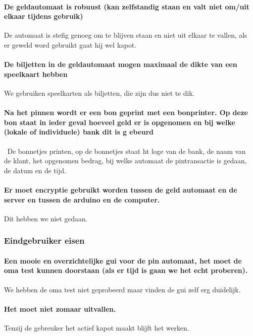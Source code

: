 \documentclass{article}
\begin{document}
\paragraph{De geldautomaat is robuust (kan zelfstandig staan en valt niet om/uit elkaar tijdens gebruik)}
De automaat is stefig genoeg om te blijven staan en niet uit elkaar te vallen, als er geweld word gebruikt gaat hij wel kapot.

\paragraph{De biljetten in de geldautomaat mogen maximaal de dikte van een speelkaart hebben}
We gebruiken speelkarten als biljetten, die zijn dus niet te dik.

\paragraph{Na het pinnen wordt er een bon geprint met een bonprinter. Op deze bon staat in ieder geval hoeveel geld er is opgenomen en bij welke (lokale of individuele) bank dit is g
ebeurd}\
De bonnetjes printen, op de bonnetjes staat ht loge van de bank, de naam van de klant, het opgenomen bedrag, bij welke automaat de pintransactie is gedaan, de datum en de tijd.

\paragraph{Er moet encryptie gebruikt worden tussen de geld automaat en de server en tussen de arduino en de computer.}
Dit hebben we niet gedaan.

\subsubsection{Eindgebruiker eisen}

\paragraph{Een mooie en overzichtelijke gui voor de pin automaat, het moet de oma test kunnen doorstaan (als er tijd is gaan we het echt proberen).}
We hebben de oma test niet geprobeerd maar vinden de gui zelf erg duidelijk.

\paragraph{Het moet niet zomaar uitvallen.}
Tenzij de gebreuker het actief kapot maakt blijft het werken.
\end{document}
